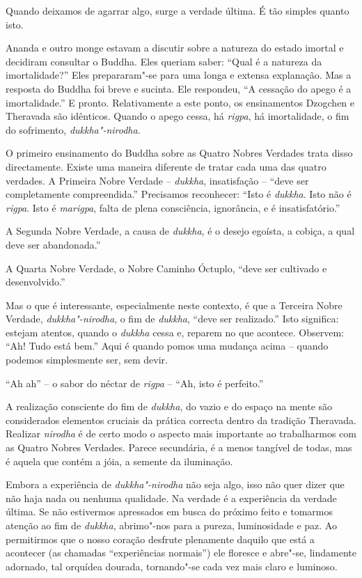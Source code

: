 Quando deixamos de agarrar algo, surge a verdade última. É tão simples
quanto isto.

Ananda e outro monge estavam a discutir sobre a natureza do estado
imortal e decidiram consultar o Buddha. Eles queriam saber: ``Qual é a
natureza da imortalidade?'' Eles prepararam"-se para uma longa e extensa
explanação. Mas a resposta do Buddha foi breve e sucinta. Ele respondeu,
``A cessação do apego é a imortalidade.'' E pronto. Relativamente a este
ponto, os ensinamentos Dzogchen e Theravada são idênticos. Quando o
apego cessa, há \emph{rigpa}, há imortalidade, o fim do sofrimento,
\emph{dukkha"-nirodha}.

O primeiro ensinamento do Buddha sobre as Quatro Nobres Verdades trata
disso directamente. Existe uma maneira diferente de tratar cada uma das
quatro verdades. A Primeira Nobre Verdade -- \emph{dukkha}, insatisfação
-- ``deve ser completamente compreendida.'' Precisamos reconhecer:
``Isto é \emph{dukkha}. Isto não é \emph{rigpa}. Isto é \emph{marigpa},
falta de plena consciência, ignorância, e é insatisfatório.''

A Segunda Nobre Verdade, a causa de \emph{dukkha}, é o desejo egoísta, a
cobiça, a qual deve ser abandonada.''

A Quarta Nobre Verdade, o Nobre Caminho Óctuplo, ``deve ser cultivado e
desenvolvido.''

Mas o que é interessante, especialmente neste contexto, é que a Terceira
Nobre Verdade, \emph{dukkha"-nirodha}, o fim de \emph{dukkha}, ``deve
ser realizado.'' Isto significa: estejam atentos, quando o
\emph{dukkha} cessa e, reparem no que acontece. Observem: ``Ah! Tudo
está bem.'' Aqui é quando pomos uma mudança acima -- quando podemos
simplesmente ser, sem devir.

``Ah ah'' -- o sabor do néctar de \emph{rigpa} -- ``Ah, isto é
perfeito.''

A realização consciente do fim de \emph{dukkha}, do vazio e do espaço na
mente são considerados elementos cruciais da prática correcta dentro da
tradição Theravada. Realizar \emph{nirodha} é de certo modo o aspecto
mais importante ao trabalharmos com as Quatro Nobres Verdades. Parece
secundária, é a menos tangível de todas, mas é aquela que contém a jóia,
a semente da iluminação.

Embora a experiência de \emph{dukkha"-nirodha} não seja algo, isso não
quer dizer que não haja nada ou nenhuma qualidade. Na verdade é a
experiência da verdade última. Se não estivermos apressados em busca do
próximo feito e tomarmos atenção ao fim de \emph{dukkha}, abrimo"-nos
para a pureza, luminosidade e paz. Ao permitirmos que o nosso coração
desfrute plenamente daquilo que está a acontecer (as chamadas
``experiências normais'') ele floresce e abre"-se, lindamente adornado,
tal orquídea dourada, tornando"-se cada vez mais claro e luminoso.

